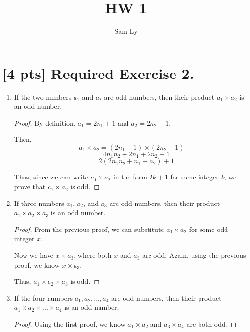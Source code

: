 \documentclass{article}
\title{HW 1}
\author{Sam Ly}
\begin{document}
\maketitle

\section*{[4 pts] Required Exercise 2.}

\begin{enumerate}
    \item {
        If the two numbers \(a_1\) and \(a_2\) are odd numbers,
        then their product \(a_1 \times a_2\) is an odd number.

        \begin{proof}
            By definition, \(a_1 = 2n_1 + 1\) and \(a_2 = 2n_2 + 1\).

            Then, 
            \[ a_1 \times a_2 = (2n_1 + 1) \times (2n_2 + 1)\]
            \[ = 4n_1n_2 + 2n_1 + 2n_2 + 1\]
            \[ = 2(2n_1n_2 + n_1 + n_2) + 1 \]

            Thus, since we can write \(a_1 \times a_2 \) in the form \(2k + 1 \) for some
            integer \(k\), we prove that \(a_1 \times a_2 \) is odd.
        \end{proof}
    }

    \item {
        If three numbers $a_1$, $a_2$, and $a_3$ are odd numbers, then their product 
        \(a_1 \times a_2 \times a_3 \) is an odd number.

        \begin{proof}
            From the previous proof, we can substitute \(a_1 \times a_2 \) for 
            some odd integer \(x\).

            Now we have \(x \times a_3\), where both \(x\) and \(a_3\) are odd.
            Again, using the previous proof, we know \(x \times a_3\).

            Thus, \(a_1 \times a_2 \times a_3 \) is odd.
        \end{proof}
    }

    \item {
        If the four numbers \(a_1, a_2, ..., a_4 \)
        are odd numbers, then their product \(a_1 \times a_2 \times ... \times a_4\)
        is an odd number.

        \begin{proof}
            Using the first proof, we know \(a_1 \times a_2 \)  and \(a_3 \times a_4\) 
            are both odd.


\end{proof}}
\end{enumerate}
\end{document}
